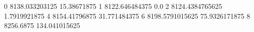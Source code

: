 0 8138.033203125 15.38671875
1 8122.646484375 0.0
2 8124.4384765625 1.7919921875
4 8154.41796875 31.771484375
6 8198.5791015625 75.9326171875
8 8256.6875 134.041015625
